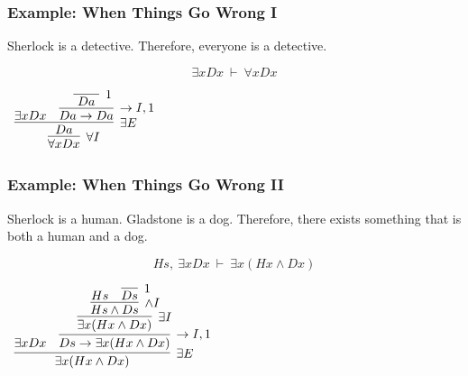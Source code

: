 \documentclass{beamer}
\theoremstyle{indentDefn} \newtheorem{defn}[]{Definition}
\begin{document}
\begin{frame}
	\frametitle{Example: When Things Go Wrong I}
	
	Sherlock is a detective. Therefore, everyone is a detective. 
	
	\vspace{5mm}
	
	$$ \exists x Dx \ \vdash \ \forall x Dx $$
	
	\vspace{5mm}
	
	\begin{center}
		$\begin{array}{c}
			\infer[\forall I]{\forall x Dx}{\infer[\exists E]{Da}
					{\exists x Dx & \infer[\rightarrow I, 1]{Da \rightarrow Da}{\infer[1]{ \ Da \ }{}}
				}
			}		
		 \end{array}$
	\end{center}

	\vspace{20mm}	
\end{frame}
	
\begin{frame}
	\frametitle{Example: When Things Go Wrong II}
	
	Sherlock is a human. Gladstone is a dog. Therefore, there exists something that is both a human and a dog. 
	
	\vspace{5mm}
	
	$$ Hs, \ \exists x Dx \ \vdash \ \exists x (Hx \land Dx) $$
	
	\vspace{5mm}
	
	\begin{center}
		$\begin{array}{c}	
			\infer[\exists E]{\exists x (Hx \land Dx)}{\exists x Dx & \infer[\rightarrow I, 1]{Ds \rightarrow \exists x (Hx \land Dx)}
				{\infer[\exists I]{\exists x (Hx \land Dx)}
					{\infer[\land I]{Hs \land Ds}
						{Hs & \infer[1]{Ds}
							{}}}}}
	     \end{array}$
	\end{center}
\end{frame}
\end{document}
